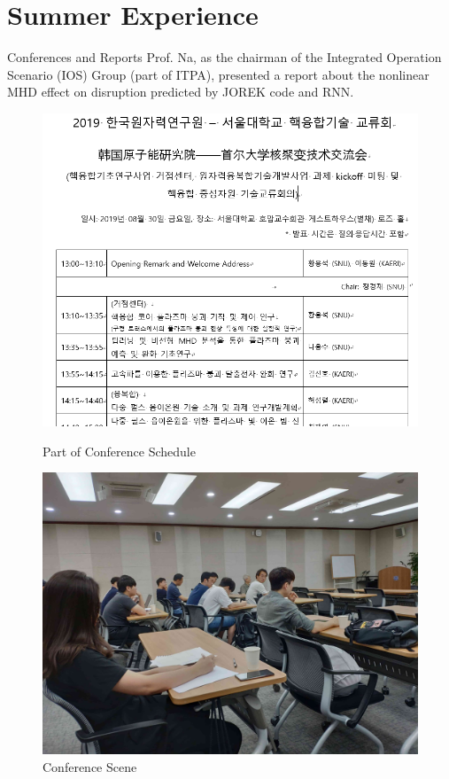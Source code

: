 \section{Summer Experience}


\begin{frame}{Conferences and Reports}
 Prof. Na, as the chairman of the Integrated Operation Scenario (IOS) Group (part of ITPA), presented a report about the nonlinear MHD effect on disruption predicted by JOREK code and RNN. 
\begin{figure}
\begin{minipage}[t]{0.5\linewidth}
\centering
\includegraphics[width=\linewidth]{figures/ConferenceSchedule.png}
\caption{Part of Conference Schedule}
\end{minipage}%
\begin{minipage}[t]{0.5\linewidth}
\centering
\includegraphics[width=\linewidth]{figures/conference_photo.jpg}
\caption{Conference Scene}
\end{minipage}
\end{figure}

\end{frame}

